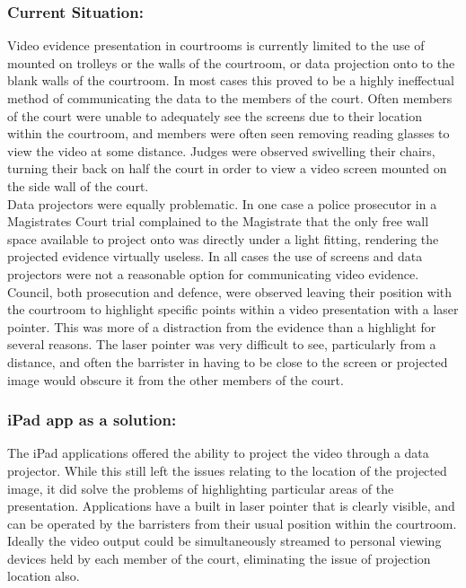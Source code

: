 \subsubsection{Current Situation:}
Video evidence presentation in courtrooms is currently limited to the use of  mounted on trolleys or the walls of the courtroom, or data projection onto to the blank walls of the courtroom. In most cases this proved to be a highly ineffectual method of communicating the data to the members of the court. Often members of the court were unable to adequately see the screens due to their location within the courtroom, and members were often  seen removing reading glasses to view the video at some distance. Judges were observed swivelling their chairs, turning their back on half the court in order to view a video screen mounted on the side wall of the court.\\
Data projectors were equally problematic. In one case a police prosecutor in a Magistrates Court trial complained to the Magistrate that the only free wall space available to project onto was directly under a light fitting, rendering the projected evidence virtually useless.
In all cases the use of screens and data projectors were not a reasonable option for communicating video evidence. \\
Council, both prosecution and defence, were observed leaving their position with the courtroom to highlight specific points within a video presentation with a laser pointer. This was more of a distraction from the evidence than a highlight for several reasons. The laser pointer was very difficult to see, particularly from a distance, and often the barrister in having to be close to the screen or projected image would obscure it from the other members of the court.\\
\subsubsection{iPad app as a solution:}
The iPad applications offered the ability to project the video through a data projector. While this still left the issues relating to the location of the projected image, it did solve the problems of highlighting particular areas of the presentation. Applications have a built in laser pointer that is clearly visible, and can be operated by the barristers from their usual position within the courtroom. Ideally the video output could be simultaneously streamed to personal viewing devices held by each member of the court, eliminating the issue of projection location also.\\
